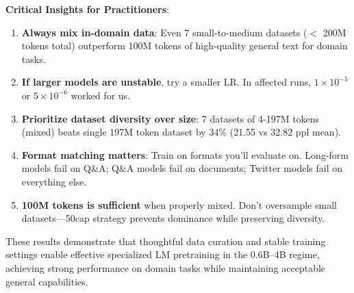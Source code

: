 \textbf{Critical Insights for Practitioners}:

\begin{enumerate}
\item \textbf{Always mix in-domain data}: Even 7 small-to-medium datasets ($<$ 200M tokens total) outperform 100M tokens of high-quality general text for domain tasks.
\item \textbf{If larger models are unstable}, try a smaller LR. In affected runs, $1\times10^{-5}$ or $5\times10^{-6}$ worked for us.
\item \textbf{Prioritize dataset diversity over size}: 7 datasets of 4-197M tokens (mixed) beats single 197M token dataset by 34\% (21.55 vs 32.82 ppl mean).
\item \textbf{Format matching matters}: Train on formats you'll evaluate on. Long-form models fail on Q\&A; Q\&A models fail on documents; Twitter models fail on everything else.
\item \textbf{100M tokens is sufficient} when properly mixed. Don't oversample small datasets—50cap strategy prevents dominance while preserving diversity.
\end{enumerate}

These results demonstrate that thoughtful data curation and stable training settings enable effective specialized LM pretraining in the 0.6B–4B regime, achieving strong performance on domain tasks while maintaining acceptable general capabilities.
